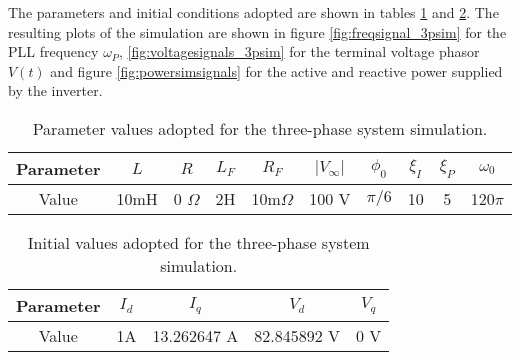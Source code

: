 \begin{example}
	The parameters and initial conditions adopted are shown in tables \ref{tab:3p_sim_params} and \ref{tab:3p_sim_init_conds}. The resulting plots of the simulation are shown in figure \ref{fig:freqsignal_3psim} for the PLL frequency $\omega_P$, \ref{fig:voltagesignals_3psim} for the terminal voltage phasor $V(t)$ and figure \ref{fig:powersimsignals} for the active and reactive power supplied by the inverter.

\renewcommand{\arraystretch}{1.2}
\begin{table}[h]
\begin{center}
\begin{tabular}{ c|c|c|c|c|c|c|c|c|c } 
\hline 
Parameter & $L$ & $R$ & $L_F$ & $R_F$ & $\left\lvert V_\infty \right\rvert$ & $\phi_0$ & $\xi_I$ & $\xi_P$ & $\omega_0$ \\
\hline
Value & 10mH & 0 $\Omega$ & 2H & 10m$\Omega$ & 100 V & $\pi/6$ & 10 & 5 & 120$\pi$ \\ 
\hline
\end{tabular}
\end{center}
\caption{Parameter values adopted for the three-phase system simulation.}
\label{tab:3p_sim_params}
\end{table} %

\renewcommand{\arraystretch}{1.2}
\begin{table}[h]
\begin{center}
\begin{tabular}{ c|c|c|c|c} 
\hline 
Parameter & $I_d$ & $I_q$ & $V_d$ & $V_q$ \\
\hline
Value & 1A & 13.262647 A & 82.845892 V & 0 V \\ 
\hline
\end{tabular}
\end{center}
\caption{Initial values adopted for the three-phase system simulation.}
\label{tab:3p_sim_init_conds}
\end{table}


\end{example}
